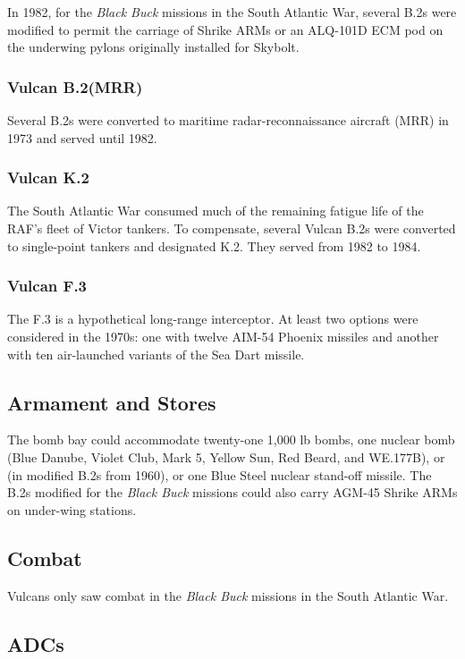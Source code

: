 In 1982, for the {\itshape Black Buck} missions in the South Atlantic War, several B.2s were modified to permit the carriage of Shrike ARMs or an ALQ-101D ECM pod on the underwing pylons originally installed for Skybolt.

\subsubsection{Vulcan B.2(MRR)}

Several B.2s were converted to maritime radar-reconnaissance aircraft (MRR) in 1973 and served until 1982.

\subsubsection{Vulcan K.2}

The South Atlantic War consumed much of the remaining fatigue life of the RAF's fleet of Victor tankers. To compensate, several Vulcan B.2s were converted to single-point tankers and designated K.2. They served from 1982 to 1984.

\subsubsection{Vulcan F.3}

The F.3 is a hypothetical long-range interceptor. At least two options were considered in the 1970s: one with twelve AIM-54 Phoenix missiles and another with ten air-launched variants of the Sea Dart missile.

\subsection{Armament and Stores}

The bomb bay could accommodate twenty-one 1,000 lb bombs, one nuclear bomb (Blue Danube, Violet Club, Mark 5, Yellow Sun, Red Beard, and WE.177B), or (in modified B.2s from 1960), or one Blue Steel nuclear stand-off missile. The B.2s modified for the {\itshape Black Buck} missions could also carry AGM-45 Shrike ARMs on under-wing stations.

\subsection{Combat}

Vulcans only saw combat in the {\itshape Black Buck} missions in the South Atlantic War.

\subsection{ADCs}

